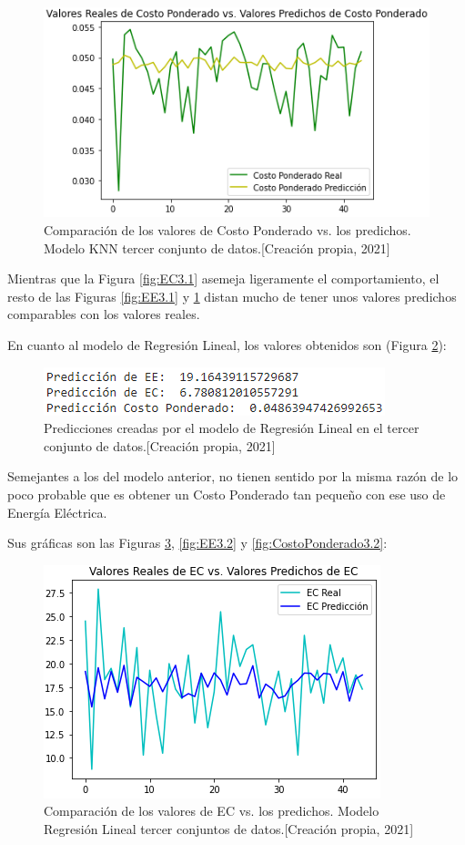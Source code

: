 \documentclass{article}
\begin{document}
\begin{figure}[!h]
    \centering
    \includegraphics[scale=.7]{F4/F4-im27.PNG}
    \caption{Comparación de los valores de Costo Ponderado vs. los predichos. Modelo KNN tercer conjunto de datos.[Creación propia, 2021]}
    \label{fig:CostoPonderado3.1}
\end{figure}
\pagebreak
Mientras que la Figura \ref{fig:EC3.1} asemeja ligeramente el comportamiento, el resto de las Figuras \ref{fig:EE3.1} y \ref{fig:CostoPonderado3.1} distan mucho de tener unos valores predichos comparables con los valores reales.

En cuanto al modelo de Regresión Lineal, los valores obtenidos son (Figura \ref{fig:predicciones3.2}):

\begin{figure}[!h]
    \centering
    \includegraphics[scale=.7]{F4/F4-im28.PNG}
    \caption{Predicciones creadas por el modelo de Regresión Lineal en el tercer conjunto de datos.[Creación propia, 2021]}
    \label{fig:predicciones3.2}
\end{figure}

Semejantes a los del modelo anterior, no tienen sentido por la misma razón de lo poco probable que es obtener un Costo Ponderado tan pequeño con ese uso de Energía Eléctrica.

Sus gráficas son las Figuras \ref{fig:EC3.2}, \ref{fig:EE3.2} y \ref{fig:CostoPonderado3.2}: \pagebreak

\begin{figure}[!h]
    \centering
    \includegraphics[scale=.7]{F4/F4-im29.PNG}
    \caption{Comparación de los valores de EC vs. los predichos. Modelo Regresión Lineal tercer conjuntos de datos.[Creación propia, 2021]}
    \label{fig:EC3.2}
\end{figure}
\end{document}
